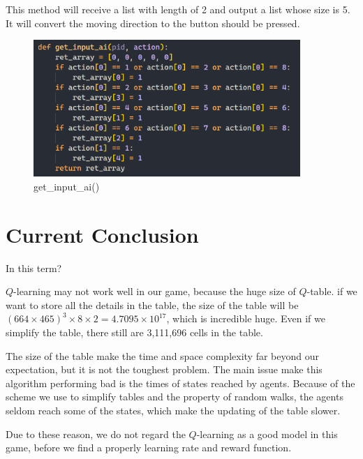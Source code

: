\documentclass[14pt]{extarticle}
\begin{document}
\begin{description}
    This method will receive a list with length of 2 and output a list whose size is 5. It will convert the moving direction to the button should be pressed.
    \begin{figure}[H]
		\begin{center}
			\includegraphics[width=0.9\textwidth]{actuator.png}
			\caption{get\_input\_ai()}
		\end{center}
	\end{figure}    
\end{description}	

\section{Current Conclusion}

In this term?

$Q$-learning may not work well in our game, because the huge size of $Q$-table. if we want to store all the details in the table, the size of the table will be $ (664 \times 465)^3 \times 8 \times 2 = 4.7095\times 10^{17} $, which is incredible huge. Even if we simplify the table, there still are 3,111,696 cells in the table. 

The size of the table make the time and space complexity far beyond our expectation, but it is not the toughest problem. The main issue make this algorithm performing bad is the times of states reached by agents. Because of the scheme we use to simplify tables and the property of random walks, the agents seldom reach some of the states, which make the updating of the table slower. 

Due to these reason, we do not regard the $Q$-learning as a good model in this game, before we find a properly learning rate and reward function.
\end{document}
